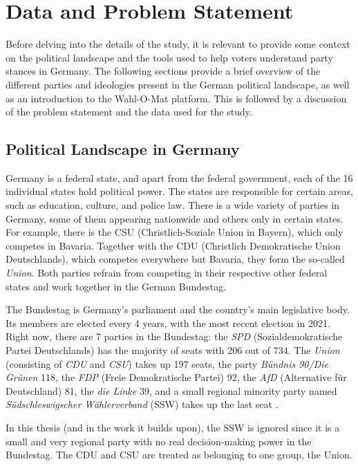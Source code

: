 \chapter{Data and Problem Statement}\label{statements}

Before delving into the details of the study, it is relevant to provide some context on the political landscape and the tools used to help voters understand party stances in Germany. The following sections provide a brief overview of the different parties and ideologies present in the German political landscape, as well as an introduction to the Wahl-O-Mat platform. This is followed by a discussion of the problem statement and the data used for the study.

\section{Political Landscape in Germany}\label{political_landscape}

Germany is a federal state, and apart from the federal government, each of the 16 individual states hold political power. The states are responsible for certain areas, such as education, culture, and police law. There is a wide variety of parties in Germany, some of them appearing nationwide and others only in certain states. For example, there is the CSU (Christlich-Soziale Union in Bayern), which only competes in Bavaria. Together with the CDU (Christlich Demokratische Union Deutschlands), which competes everywhere but Bavaria, they form the so-called \textit{Union}. Both parties refrain from competing in their respective other federal states and work together in the German Bundestag.

The Bundestag is Germany's parliament and the country's main legislative body. Its members are elected every 4 years, with the most recent election in 2021. Right now, there are 7 parties in the Bundestag: the \textit{SPD} (Sozialdemokratische Partei Deutschlands) has the majority of seats with 206 out of 734. The \textit{Union} (consisting of \textit{CDU} and \textit{CSU}) takes up 197 seats, the party \textit{Bündnis 90/Die Grünen} 118, the \textit{FDP} (Freie Demokratische Partei) 92, the \textit{AfD} (Alternative für Deutschland) 81, the \textit{die Linke} 39, and a small regional minority party named \textit{Südschleswigscher Wählerverband} (SSW) takes up the last seat \citep{wiki_bundestag}.

In this thesis (and in the work it builds upon), the SSW is ignored since it is a small and very regional party with no real decision-making power in the Bundestag. The CDU and CSU are treated as belonging to one group, the Union.

